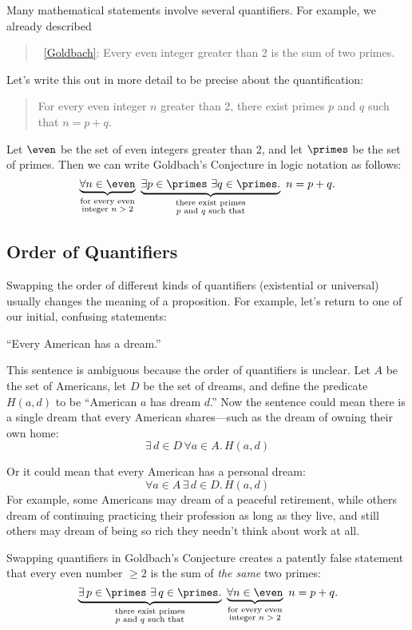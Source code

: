 Many mathematical statements involve several quantifiers.  For
example, we already described
\begin{quote}
 ~\ref{Goldbach}: Every even integer
 greater than 2 is the sum of two primes.
\end{quote}
Let's write this out in more detail to be precise about the
quantification:
\begin{quote}
For every even integer $n$ greater than 2,
there exist primes $p$ and $q$ such that $n = p + q$.
\end{quote}
Let $\even$ be the set of even integers greater than 2, and let $\primes$ be the
set of primes.  Then we can write Goldbach's Conjecture in logic
notation as follows:
\[
\underbrace{\forall n \in \even}_{\substack
    {\text{for every even} \\
     \text{integer $n > 2$}}}\
\underbrace{\exists p \in \primes\ \exists q \in \primes.}_{\substack
    {\text{there exist primes} \\
     \text{$p$ and $q$ such that}}}
\ n = p + q.
\]

\subsection{Order of Quantifiers}

Swapping the order of different kinds of quantifiers (existential or
universal) usually changes the meaning of a proposition.  For example,
let's return to one of our initial, confusing statements:
\begin{center}
``Every American has a dream.''
\end{center}

This sentence is ambiguous because the order of quantifiers is
unclear.  Let $A$ be the set of Americans, let $D$ be the set of
dreams, and define the predicate $H(a, d)$ to be ``American $a$ has
dream $d$.''  Now the sentence could mean there is a single dream
that every American shares---such as the dream of owning their own
home:
\[
\exists\, d \in D\, \forall a \in A.\, H(a, d)
\]

Or it could mean that every American has a personal dream:
\[
\forall a \in A\, \exists\, d \in D.\, H(a, d)
\]
For example, some Americans may dream of a peaceful retirement, while
others dream of continuing practicing their profession as long as they
live, and still others may dream of being so rich they needn't think
about work at all.

Swapping quantifiers in Goldbach's Conjecture creates a patently false
statement that every even number $\geq 2$ is the sum of \emph{the same}
two primes:
\[
\underbrace{\exists\, p \in \primes\ \exists\, q \in \primes.}_{\substack
    {\text{there exist primes} \\
     \text{$p$ and $q$ such that}}}
\
\underbrace{\forall n \in \even}_{\substack
    {\text{for every even} \\
     \text{integer $n > 2$}}}
\ n = p + q.
\]

